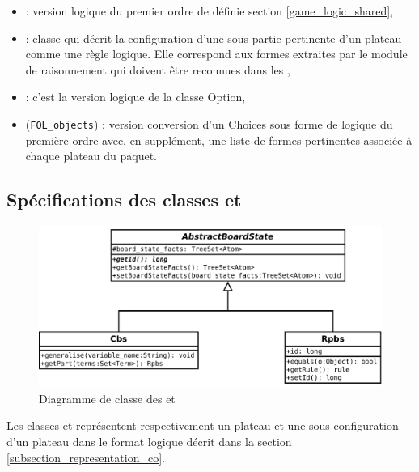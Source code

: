 \begin{itemize}
  \item \textbf{} : version logique du premier ordre de  définie section \vref{game_logic_shared},
  
  \item \textbf{} : classe qui décrit la configuration d'une sous-partie pertinente d'un plateau comme une règle logique. Elle correspond aux \og formes \fg{} extraites par le module de raisonnement qui doivent être reconnues dans les ,
  
   \item \textbf{} : c'est la version logique de la classe \gls{Option},
   \item {} (\texttt{FOL\_objects}) : version conversion d'un \gls{Choices} sous forme de logique du première ordre avec, en supplément, une liste de formes pertinentes associée à chaque plateau du paquet.
\end{itemize}


\subsection{Spécifications des classes  et }
\label{subsection_cbs_rpbs}

\begin{figure}[H] 
\centering
    \includegraphics[width=\textwidth]{files/class_diagram/rpbs_cbs} 
\caption{Diagramme de classe des  et } 
\label{img_diag_class_board_state}
\end{figure}

Les classes  et  représentent respectivement un plateau et une sous configuration d'un plateau dans le format logique décrit dans la section \vref{subsection_representation_co}. 